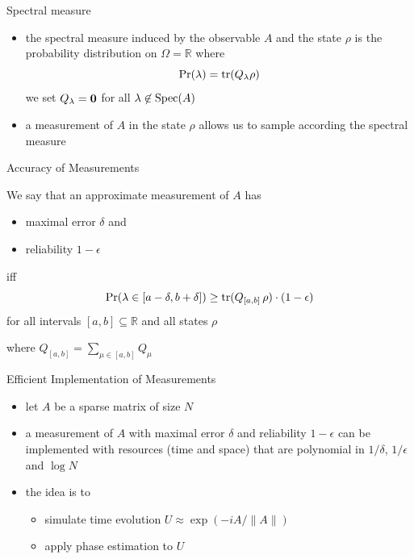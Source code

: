 \documentclass[slideColor]{prosper}
\renewcommand{\R}{{\mathbb{R}}}
\renewcommand{\>}{\rangle}
\newcommand{\<}{\langle}
\begin{document}

\begin{slide}{Spectral measure}

\begin{itemize}
\item
the spectral measure induced by the observable $A$ and the state $\rho$ is the probability distribution on $\Omega=\R$ where
\[
\Pr(\lambda) = {\rm tr}(Q_\lambda \rho)
\]
we set $Q_\lambda = {\bf 0}$ for all $\lambda\not\in {\rm Spec}(A)$

\item
a measurement of $A$ in the state $\rho$ allows us to sample according the spectral measure
\end{itemize}

\end{slide}


\begin{slide}{Accuracy of Measurements}

We say that an approximate measurement of $A$ has 
\begin{itemize}
\item maximal error $\delta$ and
\item reliability $1-\epsilon$
\end{itemize}
iff 
\[
\Pr(\lambda\in [a-\delta,b+\delta]) \ge {\rm tr}(Q_{[a,b]}\, \rho)\cdot(1-\epsilon)
\]
for all intervals $[a,b]\subseteq\R$ and all states $\rho$

\bigskip
where $Q_{[a,b]} = \sum_{\mu\in [a,b]} Q_\mu$

\end{slide}


\begin{slide}{Efficient Implementation of Measurements}
\begin{itemize}
\item let $A$ be a sparse matrix of size $N$

\medskip
\item a measurement of $A$ with maximal error $\delta$ and reliability $1-\epsilon$ can be implemented with resources (time and space) that are polynomial in $1/\delta$, $1/\epsilon$ and $\log N$

\medskip
\item the idea is to

\begin{itemize}
\item simulate time evolution $U\approx \exp(-i A/\|A\|)$ 

\medskip
\item apply phase estimation to $U$
\end{itemize}
\end{itemize}
\end{slide}
\end{document}
